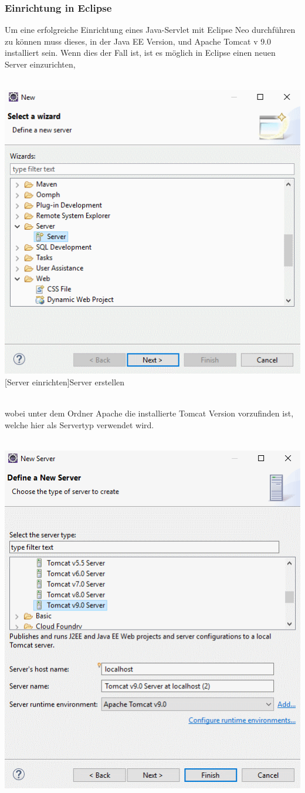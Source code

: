 \documentclass[12pt,a4paper,bibliography=totocnumbered,listof=totocnumbered]{scrartcl}
\begin{document}
\begin{minipage}{\linewidth}
\subsubsection{Einrichtung in Eclipse}
Um eine erfolgreiche Einrichtung eines Java-Servlet mit Eclipse Neo durchführen zu können muss dieses, in der Java EE Version, und Apache Tomcat v 9.0 installiert sein. 
Wenn dies der Fall ist, ist es möglich in Eclipse einen neuen Server einzurichten, \\
\\
\vspace{1em}
\begin{minipage}{\linewidth}
	\centering
	\includegraphics[width=0.7\linewidth]{Bilder/Eclipse-ServerErstellen.png}
    [Server einrichten]{Server erstellen}	
	\label{fig:eclipse1}
\end{minipage}
\\
wobei unter dem Ordner Apache die installierte Tomcat Version vorzufinden ist, welche hier  als Servertyp verwendet wird.\\
\\
\vspace{1em}
\begin{minipage}{\linewidth}
	\centering
	\includegraphics[width=0.7\linewidth]{Bilder/Eclipse-ServerErstellen1.png}

\end{minipage}
\end{minipage}
\end{document}
